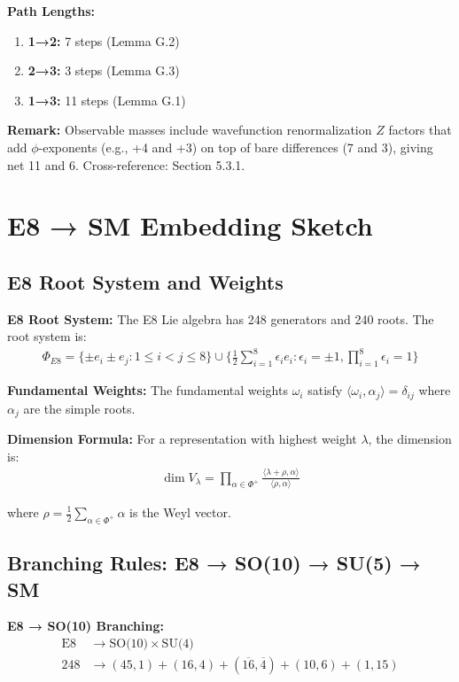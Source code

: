 \documentclass[11pt]{article}
\theoremstyle{definition}
\newcommand{\goldenratio}{\phi}
\begin{document}
\textbf{Path Lengths:}
\begin{enumerate}
\item \textbf{1→2:} 7 steps (Lemma G.2)
\item \textbf{2→3:} 3 steps (Lemma G.3)
\item \textbf{1→3:} 11 steps (Lemma G.1)
\end{enumerate}

\textbf{Remark:} Observable masses include wavefunction renormalization $Z$ factors that add $\goldenratio$-exponents (e.g., +4 and +3) on top of bare differences (7 and 3), giving net 11 and 6. Cross-reference: Section 5.3.1.

\section{E8 → SM Embedding Sketch}

\subsection{E8 Root System and Weights}

\textbf{E8 Root System:}
The E8 Lie algebra has 248 generators and 240 roots. The root system is:
\begin{align}
\Phi_{E8} = \{\pm e_i \pm e_j : 1 \leq i < j \leq 8\} \cup \{\frac{1}{2}\sum_{i=1}^8 \epsilon_i e_i : \epsilon_i = \pm 1, \prod_{i=1}^8 \epsilon_i = 1\}
\end{align}

\textbf{Fundamental Weights:}
The fundamental weights $\omega_i$ satisfy $\langle \omega_i, \alpha_j \rangle = \delta_{ij}$ where $\alpha_j$ are the simple roots.

\textbf{Dimension Formula:}
For a representation with highest weight $\lambda$, the dimension is:
\begin{align}
\dim V_\lambda = \prod_{\alpha \in \Phi^+} \frac{\langle \lambda + \rho, \alpha \rangle}{\langle \rho, \alpha \rangle}
\end{align}

where $\rho = \frac{1}{2}\sum_{\alpha \in \Phi^+} \alpha$ is the Weyl vector.

\subsection{Branching Rules: E8 → SO(10) → SU(5) → SM}

\textbf{E8 → SO(10) Branching:}
\begin{align}
\text{E8} &\to \text{SO(10)} \times \text{SU(4)} \\
248 &\to (45, 1) + (16, 4) + (\overline{16}, \overline{4}) + (10, 6) + (1, 15)
\end{align}
\end{document}
